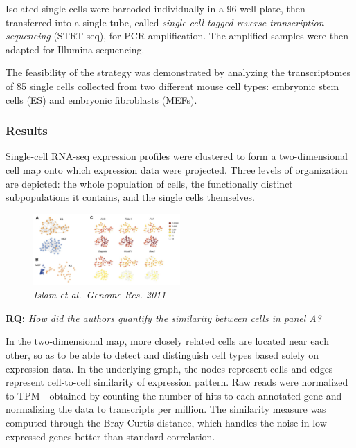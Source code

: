 Isolated single cells were barcoded individually in a 96-well plate,
then transferred into a single tube, called \emph{single-cell tagged
reverse transcription sequencing} (STRT-seq), for PCR amplification. The
amplified samples were then adapted for Illumina sequencing.

The feasibility of the strategy was demonstrated by analyzing the
transcriptomes of 85 single cells collected from two different mouse
cell types: embryonic stem cells (ES) and embryonic fibroblasts (MEFs).

\hypertarget{results-1}{%
\subsubsection{Results}\label{results-1}}

Single-cell RNA-seq expression profiles were clustered to form a
two-dimensional cell map onto which expression data were projected.
Three levels of organization are depicted: the whole population of
cells, the functionally distinct subpopulations it contains, and the
single cells themselves.

\begin{figure}
\centering
\includegraphics[width=0.5\textwidth]{images/Screen_Shot_2023-02-20_at_19-24-40.png}
\caption{\emph{Islam et al.~Genome Res. 2011}}
\end{figure}

\begin{tcolorbox}
[width=\linewidth, sharp corners=all, colback=white!95!black]

\textbf{RQ: }\emph{How did the authors quantify the similarity between cells in panel
A?}

In the two-dimensional map, more closely related cells are located near
each other, so as to be able to detect and distinguish cell types based
solely on expression data. In the underlying graph, the nodes represent
cells and edges represent cell-to-cell similarity of expression pattern.
Raw reads were normalized to TPM - obtained by counting the number of
hits to each annotated gene and normalizing the data to transcripts per
million. The similarity measure was computed through the Bray-Curtis
distance, which handles the noise in low-expressed genes better than
standard correlation.
\end{tcolorbox}


